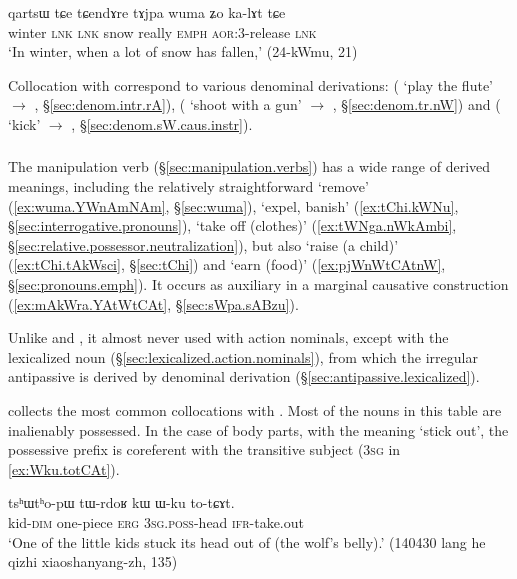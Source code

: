 \begin{exe}
\ex \label{ex:tAjpa.kalAt}
\gll qartsɯ tɕe tɕendɤre tɤjpa wuma ʑo ka-lɤt tɕe \\
winter \textsc{lnk} \textsc{lnk} snow really \textsc{emph} \textsc{aor}:3\flobv{}-release \textsc{lnk} \\
\glt `In winter, when a lot of snow has fallen,' (24-kWmu, 21)
\end{exe}

Collocation with  correspond to various denominal derivations:  ( `play the flute' $\rightarrow$ , §\ref{sec:denom.intr.rA}),  ( `shoot with a gun' $\rightarrow$ , §\ref{sec:denom.tr.nW}) and  ( `kick'  $\rightarrow$ , §\ref{sec:denom.sW.caus.instr}).

\subsubsection{ } \label{sec:tCAt.lv}
The manipulation verb  (§\ref{sec:manipulation.verbs}) has a wide range of derived meanings, including the relatively straightforward `remove' (\ref{ex:wuma.YWnAmNAm}, §\ref{sec:wuma}), `expel, banish' (\ref{ex:tChi.kWNu}, §\ref{sec:interrogative.pronouns}), `take off (clothes)' (\ref{ex:tWNga.nWkAmbi}, §\ref{sec:relative.possessor.neutralization}), but also `raise (a child)' (\ref{ex:tChi.tAkWsci}, §\ref{sec:tChi}) and `earn (food)' (\ref{ex:pjWnWtCAtnW}, §\ref{sec:pronouns.emph}). It occurs as auxiliary in a marginal causative construction (\ref{ex:mAkWra.YAtWtCAt}, §\ref{sec:sWpa.sABzu}).

Unlike  and , it almost never used with  action nominals, except with the lexicalized noun  (§\ref{sec:lexicalized.action.nominals}), from which the irregular antipassive  is derived by denominal derivation (§\ref{sec:antipassive.lexicalized}).

 collects the most common collocations with . Most of the nouns in this table are inalienably possessed. In the case of body parts, with the meaning `stick out', the possessive prefix is coreferent with the transitive subject (\textsc{3sg} in \ref{ex:Wku.totCAt}).

\begin{exe}
\ex \label{ex:Wku.totCAt}
\gll tsʰɯtʰo-pɯ tɯ-rdoʁ kɯ ɯ-ku to-tɕɤt. \\
kid-\textsc{dim} one-piece \textsc{erg} \textsc{3sg}.\textsc{poss}-head \textsc{ifr}-take.out \\
\glt `One of the little kids stuck its head out of (the wolf's belly).' (140430 lang he qizhi xiaoshanyang-zh, 135)
\end{exe}

